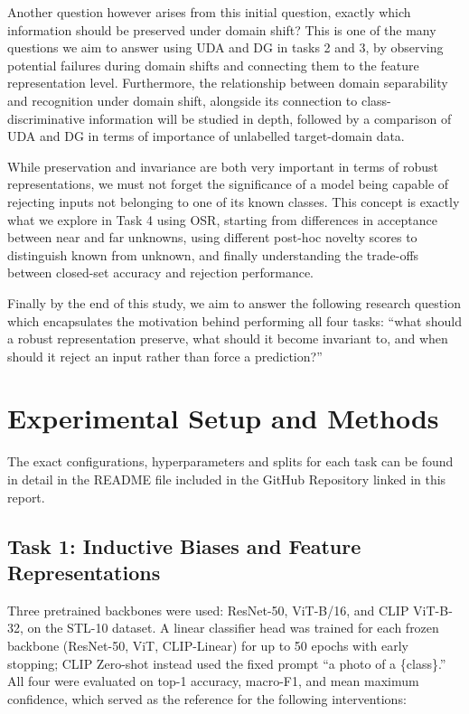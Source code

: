 \documentclass{article}
\begin{document}
Another question however arises from this initial question, exactly which information should be preserved under domain shift? This is one of the many questions we aim to answer using UDA and DG in tasks 2 and 3, by observing potential failures during domain shifts and connecting them to the feature representation level. Furthermore, the relationship between domain separability and recognition under domain shift, alongside its connection to class-discriminative information will be studied in depth, followed by a comparison of UDA and DG in terms of importance of unlabelled target-domain data.

While preservation and invariance are both very important in terms of robust representations, we must not forget the significance of a model being capable of rejecting inputs not belonging to one of its known classes. This concept is exactly what we explore in Task 4 using OSR, starting from differences in acceptance between near and far unknowns, using different post-hoc novelty scores to distinguish known from unknown, and finally understanding the trade-offs between closed-set accuracy and rejection performance.

Finally by the end of this study, we aim to answer the following research question which encapsulates the motivation behind performing all four tasks: “what should a robust representation preserve, what should it become invariant to, and when should it reject an input rather than force a prediction?”



\section{Experimental Setup and Methods}
\label{sec:methods}
The exact configurations, hyperparameters and splits for each task can be found in detail in the README file included in the GitHub Repository linked in this report.

\subsection{Task 1: Inductive Biases and Feature Representations}
\label{subsec:methods-task1}

Three pretrained backbones were used: ResNet-50, ViT-B/16, and CLIP ViT-B-32, on the STL-10 dataset. A linear classifier head was trained for each frozen backbone (ResNet-50, ViT, CLIP-Linear) for up to 50 epochs with early stopping; CLIP Zero-shot instead used the fixed prompt ``a photo of a \{class\}.'' All four were evaluated on top-1 accuracy, macro-F1, and mean maximum confidence, which served as the reference for the following interventions:
\end{document}
